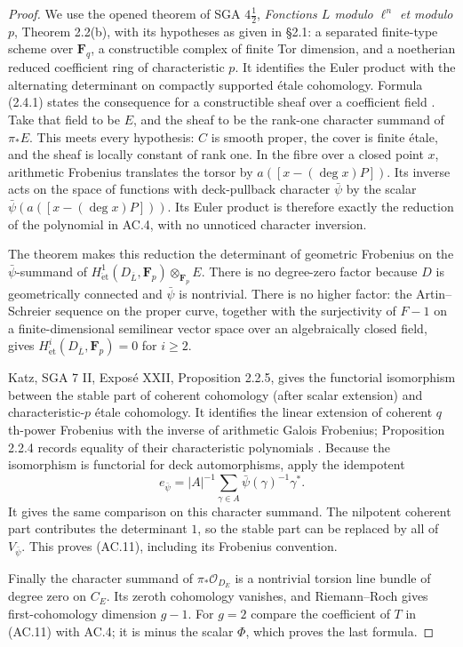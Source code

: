 \begin{proof}
We use the opened theorem of SGA $4\frac12$, \emph{Fonctions $L$ modulo
$\ell^n$ et modulo $p$}, Theorem 2.2(b), with its hypotheses as given
in \S2.1: a separated finite-type scheme over $\mathbf F_q$, a
constructible complex of finite Tor dimension, and a noetherian reduced
coefficient ring of characteristic $p$.  It identifies the Euler product
with the alternating determinant on compactly supported \'etale
cohomology.  Formula (2.4.1) states the consequence for a constructible
sheaf over a coefficient field \cite{AC_Deligne1977}.
Take that field to be $E$, and the sheaf to be the rank-one character
summand of $\pi_*E$.  This meets every hypothesis: $C$ is smooth proper,
the cover is finite \'etale, and the sheaf is locally constant of rank
one.  In the fibre over a closed point $x$, arithmetic Frobenius
translates the torsor by $a([x-(\deg x)P])$.  Its inverse acts on the
space of functions with deck-pullback character $\bar\psi$ by the scalar
$\bar\psi(a([x-(\deg x)P]))$.  Its Euler product is therefore exactly
the reduction of the polynomial in AC.4, with no unnoticed character
inversion.

The theorem makes this reduction the determinant of geometric Frobenius
on the $\bar\psi$-summand of $H^1_{\mathrm{\acute et}}
(D_{\overline L},\mathbf F_p)\otimes_{\mathbf F_p}E$.
There is no degree-zero factor because $D$ is geometrically connected
and $\bar\psi$ is nontrivial.  There is no higher factor: the
Artin--Schreier sequence on the proper curve, together with the
surjectivity of $F-1$ on a finite-dimensional semilinear vector space
over an algebraically closed field, gives
$H^i_{\mathrm{\acute et}}(D_{\overline L},\mathbf F_p)=0$ for $i\ge2$.

Katz, SGA 7 II, Expos\'e XXII, Proposition 2.2.5, gives the functorial
isomorphism between the stable part of coherent cohomology (after scalar
extension) and characteristic-$p$ \'etale cohomology.  It identifies the
linear extension of coherent $q$th-power Frobenius with the inverse of
arithmetic Galois Frobenius; Proposition 2.2.4 records equality of their
characteristic polynomials \cite{AC_Katz1973}.  Because the isomorphism
is functorial for deck automorphisms, apply the idempotent
\[
          e_{\bar\psi}=|A|^{-1}
              \sum_{\gamma\in A}\bar\psi(\gamma)^{-1}\gamma^*.
\]
It gives the same comparison on this character summand.  The nilpotent
coherent part contributes the determinant $1$, so the stable part can
be replaced by all of $V_{\bar\psi}$.  This proves (AC.11), including its
Frobenius convention.

Finally the character summand of $\pi_*\mathcal O_{D_E}$ is a nontrivial
torsion line bundle of degree zero on $C_E$.  Its zeroth cohomology
vanishes, and Riemann--Roch gives first-cohomology dimension $g-1$.
For $g=2$ compare the coefficient of $T$ in (AC.11) with AC.4; it is
minus the scalar $\Phi$, which proves the last formula.
\end{proof}

